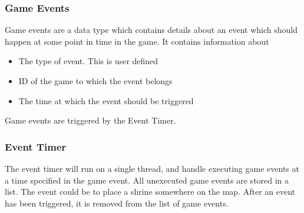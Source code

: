 \subsubsection{Game Events}\label{subsec:gameEvents}
Game events are a data type which contains details about an event which should happen at some point in time in the game. It contains information about

\begin{itemize}
\item The type of event. This is user defined
\item ID of the game to which the event belongs
\item The time at which the event should be triggered
\end{itemize}

Game events are triggered by the Event Timer.

\subsubsection{Event Timer}\label{subsec:eventtimerdesign}
The event timer will run on a single thread, and handle executing game events at a time specified in the game event. All unexecuted game events are stored in a list. The event could be to place a shrine somewhere on the map. After an event has been triggered, it is removed from the list of game events.